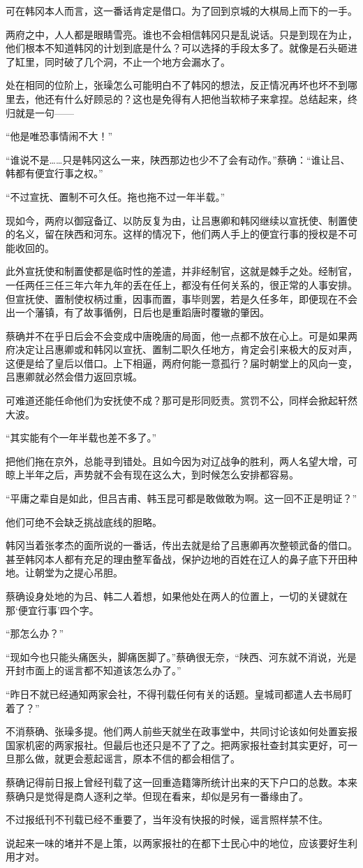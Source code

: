 可在韩冈本人而言，这一番话肯定是借口。为了回到京城的大棋局上而下的一手。

两府之中，人人都是眼睛雪亮。谁也不会相信韩冈只是乱说话。只是到现在为止，他们根本不知道韩冈的计划到底是什么？可以选择的手段太多了。就像是石头砸进了缸里，同时破了几个洞，不止一个地方会漏水了。

处在相同的位阶上，张璪怎么可能明白不了韩冈的想法，反正情况再坏也坏不到哪里去，他还有什么好顾忌的？这也是免得有人把他当软柿子来拿捏。总结起来，终归就是一句——

“他是唯恐事情闹不大！”

“谁说不是……只是韩冈这么一来，陕西那边也少不了会有动作。”蔡确：“谁让吕、韩都有便宜行事之权。”

“不过宣抚、置制不可久任。拖也拖不过一年半载。”

现如今，两府以御寇备辽、以防反复为由，让吕惠卿和韩冈继续以宣抚使、制置使的名义，留在陕西和河东。这样的情况下，他们两人手上的便宜行事的授权是不可能收回的。

此外宣抚使和制置使都是临时性的差遣，并非经制官，这就是棘手之处。经制官，一任两任三任三年六年九年的丢在任上，都没有任何关系的，很正常的人事安排。但宣抚使、置制使权柄过重，因事而置，事毕则罢，若是久任多年，即便现在不会出一个藩镇，有了故事循例，日后也是重蹈唐时覆辙的肇因。

蔡确并不在乎日后会不会变成中唐晚唐的局面，他一点都不放在心上。可是如果两府决定让吕惠卿或和韩冈以宣抚、置制二职久任地方，肯定会引来极大的反对声，这便是给了皇后以借口。上下相逼，两府何能一意孤行？届时朝堂上的风向一变，吕惠卿就必然会借力返回京城。

可难道还能任命他们为安抚使不成？那可是形同贬责。赏罚不公，同样会掀起轩然大波。

“其实能有个一年半载也差不多了。”

把他们拖在京外，总能寻到错处。且如今因为对辽战争的胜利，两人名望大增，可晾上半年之后，声势就不会有现在这么大，到时候怎么安排都容易。

“平庸之辈自是如此，但吕吉甫、韩玉昆可都是敢做敢为啊。这一回不正是明证？”

他们可绝不会缺乏挑战底线的胆略。

韩冈当着张孝杰的面所说的一番话，传出去就是给了吕惠卿再次整顿武备的借口。甚至韩冈本人都有充足的理由整军备战，保护边地的百姓在辽人的鼻子底下开田种地。让朝堂为之提心吊胆。

蔡确设身处地的为吕、韩二人着想，如果他处在两人的位置上，一切的关键就在那‘便宜行事’四个字。

“那怎么办？”

“现如今也只能头痛医头，脚痛医脚了。”蔡确很无奈，“陕西、河东就不消说，光是开封市面上的谣言都不知道该怎么办了。”

“昨日不就已经通知两家会社，不得刊载任何有关的话题。皇城司都遣人去书局盯着了？”

不消蔡确、张璪多提。他们两人前些天就坐在政事堂中，共同讨论该如何处置妄报国家机密的两家报社。但最后也还只是不了了之。把两家报社查封其实更好，可一旦那么做，就更会惹起谣言，原本不信的都会相信了。

蔡确记得前日报上曾经刊载了这一回重造籍簿所统计出来的天下户口的总数。本来蔡确只是觉得是商人逐利之举。但现在看来，却似是另有一番缘由了。

不过报纸刊不刊载已经不重要了，当年没有快报的时候，谣言照样禁不住。

说起来一味的堵并不是上策，以两家报社的在都下士民心中的地位，应该要好生利用才对。
